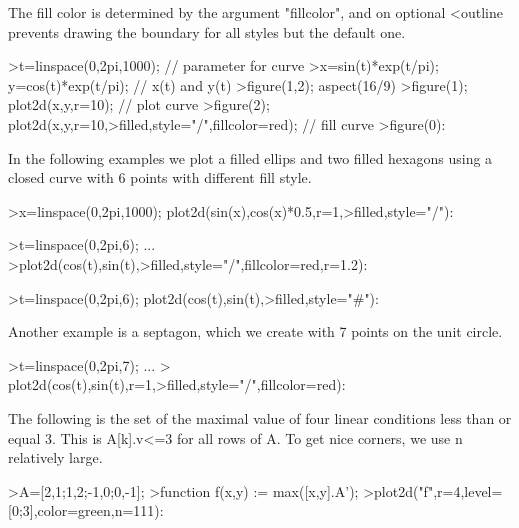 \documentclass{article}
\begin{document}
\begin{eulernotebook}
\begin{eulercomment}
\begin{eulercomment}
\begin{eulercomment}
\begin{eulercomment}
\begin{eulercomment}
\begin{eulercomment}
\begin{eulercomment}
The fill color is determined by the argument "fillcolor", and on optional \textless{}outline
prevents drawing the boundary for all styles but the default one.
\end{eulercomment}
\begin{eulerprompt}
>t=linspace(0,2pi,1000); // parameter for curve
>x=sin(t)*exp(t/pi); y=cos(t)*exp(t/pi); // x(t) and y(t)
>figure(1,2); aspect(16/9)
>figure(1); plot2d(x,y,r=10); // plot curve
>figure(2); plot2d(x,y,r=10,>filled,style="/",fillcolor=red); // fill curve
>figure(0):
\end{eulerprompt}
\begin{eulercomment}
In the following examples we plot a filled ellips and two filled hexagons using a
closed curve with 6 points with different fill style.
\end{eulercomment}
\begin{eulerprompt}
>x=linspace(0,2pi,1000); plot2d(sin(x),cos(x)*0.5,r=1,>filled,style="/"):
\end{eulerprompt}
\begin{eulerprompt}
>t=linspace(0,2pi,6); ...
>plot2d(cos(t),sin(t),>filled,style="/",fillcolor=red,r=1.2):
\end{eulerprompt}
\begin{eulerprompt}
>t=linspace(0,2pi,6); plot2d(cos(t),sin(t),>filled,style="#"):
\end{eulerprompt}
\begin{eulercomment}
Another example is a septagon, which we create with 7 points on the unit circle.
\end{eulercomment}
\begin{eulerprompt}
>t=linspace(0,2pi,7);  ...
> plot2d(cos(t),sin(t),r=1,>filled,style="/",fillcolor=red):
\end{eulerprompt}
\begin{eulercomment}
The following is the set of the maximal value of four linear conditions less than or
equal 3. This is A[k].v\textless{}=3 for all rows of A. To get nice corners, we use n relatively
large.
\end{eulercomment}
\begin{eulerprompt}
>A=[2,1;1,2;-1,0;0,-1];
>function f(x,y) := max([x,y].A');
>plot2d("f",r=4,level=[0;3],color=green,n=111):
\end{eulerprompt}

\end{eulercomment}
\end{eulercomment}
\end{eulercomment}
\end{eulercomment}
\end{eulercomment}
\end{eulercomment}
\end{eulernotebook}
\end{document}
